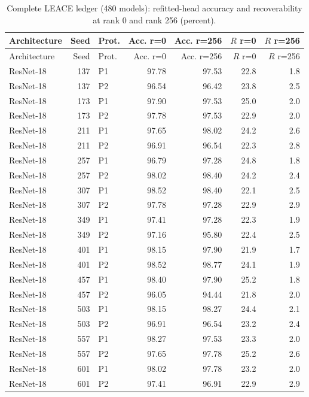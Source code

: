 {\scriptsize
\setlength{\tabcolsep}{3.5pt}
\begin{longtable}{lrlrrrr}
\caption{Complete LEACE ledger (480 models): refitted-head accuracy and recoverability at rank 0 and rank 256 (percent).}\label{r:tab:ledger-leace}\\
\toprule
Architecture & Seed & Prot. & Acc. r=0 & Acc. r=256 & $R$ r=0 & $R$ r=256 \\
\midrule
\endfirsthead
\toprule
Architecture & Seed & Prot. & Acc. r=0 & Acc. r=256 & $R$ r=0 & $R$ r=256 \\
\midrule
\endhead
\bottomrule
\endfoot
ResNet-18 & 137 & P1 & 97.78 & 97.53 & 22.8 & 1.8 \\
ResNet-18 & 137 & P2 & 96.54 & 96.42 & 23.8 & 2.5 \\
ResNet-18 & 173 & P1 & 97.90 & 97.53 & 25.0 & 2.0 \\
ResNet-18 & 173 & P2 & 97.78 & 97.53 & 22.9 & 2.0 \\
ResNet-18 & 211 & P1 & 97.65 & 98.02 & 24.2 & 2.6 \\
ResNet-18 & 211 & P2 & 96.91 & 96.54 & 22.3 & 2.8 \\
ResNet-18 & 257 & P1 & 96.79 & 97.28 & 24.8 & 1.8 \\
ResNet-18 & 257 & P2 & 98.02 & 98.40 & 24.2 & 2.4 \\
ResNet-18 & 307 & P1 & 98.52 & 98.40 & 22.1 & 2.5 \\
ResNet-18 & 307 & P2 & 97.78 & 97.28 & 22.9 & 2.9 \\
ResNet-18 & 349 & P1 & 97.41 & 97.28 & 22.3 & 1.9 \\
ResNet-18 & 349 & P2 & 97.16 & 95.80 & 22.4 & 2.5 \\
ResNet-18 & 401 & P1 & 98.15 & 97.90 & 21.9 & 1.7 \\
ResNet-18 & 401 & P2 & 98.52 & 98.77 & 24.1 & 1.9 \\
ResNet-18 & 457 & P1 & 98.40 & 97.90 & 25.2 & 1.8 \\
ResNet-18 & 457 & P2 & 96.05 & 94.44 & 21.8 & 2.0 \\
ResNet-18 & 503 & P1 & 98.15 & 98.27 & 24.4 & 2.1 \\
ResNet-18 & 503 & P2 & 96.91 & 96.54 & 23.2 & 2.4 \\
ResNet-18 & 557 & P1 & 98.27 & 97.53 & 23.3 & 2.0 \\
ResNet-18 & 557 & P2 & 97.65 & 97.78 & 25.2 & 2.6 \\
ResNet-18 & 601 & P1 & 98.02 & 97.78 & 23.2 & 2.0 \\
ResNet-18 & 601 & P2 & 97.41 & 96.91 & 22.9 & 2.9 \\

\end{longtable}}
